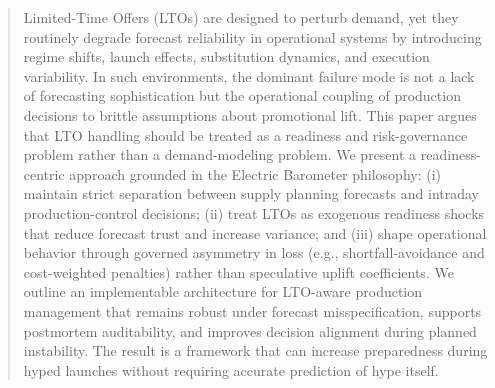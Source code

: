 \begin{abstract}
Limited-Time Offers (LTOs) are designed to perturb demand, yet they routinely degrade
forecast reliability in operational systems by introducing regime shifts, launch effects,
substitution dynamics, and execution variability. In such environments, the dominant
failure mode is not a lack of forecasting sophistication but the operational coupling of
production decisions to brittle assumptions about promotional lift. This paper argues
that LTO handling should be treated as a readiness and risk-governance problem rather
than a demand-modeling problem. We present a readiness-centric approach grounded in
the Electric Barometer philosophy: (i) maintain strict separation between supply planning
forecasts and intraday production-control decisions; (ii) treat LTOs as exogenous readiness
shocks that reduce forecast trust and increase variance; and (iii) shape operational behavior
through governed asymmetry in loss (e.g., shortfall-avoidance and cost-weighted penalties)
rather than speculative uplift coefficients. We outline an implementable architecture for
LTO-aware production management that remains robust under forecast misspecification,
supports postmortem auditability, and improves decision alignment during planned
instability. The result is a framework that can increase preparedness during hyped launches
without requiring accurate prediction of hype itself.
\end{abstract}

